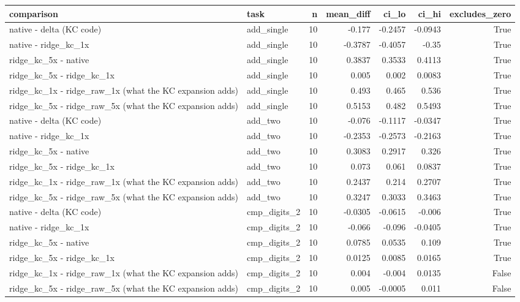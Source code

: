 \begin{table}[t]
\centering
\small
\begin{tabular}{llrrrrr}
\toprule
comparison & task & n & mean\_diff & ci\_lo & ci\_hi & excludes\_zero \\
\midrule
native - delta (KC code) & add\_single & 10 & -0.177 & -0.2457 & -0.0943 & True \\
native - ridge\_kc\_1x & add\_single & 10 & -0.3787 & -0.4057 & -0.35 & True \\
ridge\_kc\_5x - native & add\_single & 10 & 0.3837 & 0.3533 & 0.4113 & True \\
ridge\_kc\_5x - ridge\_kc\_1x & add\_single & 10 & 0.005 & 0.002 & 0.0083 & True \\
ridge\_kc\_1x - ridge\_raw\_1x (what the KC expansion adds) & add\_single & 10 & 0.493 & 0.465 & 0.536 & True \\
ridge\_kc\_5x - ridge\_raw\_5x (what the KC expansion adds) & add\_single & 10 & 0.5153 & 0.482 & 0.5493 & True \\
native - delta (KC code) & add\_two & 10 & -0.076 & -0.1117 & -0.0347 & True \\
native - ridge\_kc\_1x & add\_two & 10 & -0.2353 & -0.2573 & -0.2163 & True \\
ridge\_kc\_5x - native & add\_two & 10 & 0.3083 & 0.2917 & 0.326 & True \\
ridge\_kc\_5x - ridge\_kc\_1x & add\_two & 10 & 0.073 & 0.061 & 0.0837 & True \\
ridge\_kc\_1x - ridge\_raw\_1x (what the KC expansion adds) & add\_two & 10 & 0.2437 & 0.214 & 0.2707 & True \\
ridge\_kc\_5x - ridge\_raw\_5x (what the KC expansion adds) & add\_two & 10 & 0.3247 & 0.3033 & 0.3463 & True \\
native - delta (KC code) & cmp\_digits\_2 & 10 & -0.0305 & -0.0615 & -0.006 & True \\
native - ridge\_kc\_1x & cmp\_digits\_2 & 10 & -0.066 & -0.096 & -0.0405 & True \\
ridge\_kc\_5x - native & cmp\_digits\_2 & 10 & 0.0785 & 0.0535 & 0.109 & True \\
ridge\_kc\_5x - ridge\_kc\_1x & cmp\_digits\_2 & 10 & 0.0125 & 0.0085 & 0.0165 & True \\
ridge\_kc\_1x - ridge\_raw\_1x (what the KC expansion adds) & cmp\_digits\_2 & 10 & 0.004 & -0.004 & 0.0135 & False \\
ridge\_kc\_5x - ridge\_raw\_5x (what the KC expansion adds) & cmp\_digits\_2 & 10 & 0.005 & -0.0005 & 0.011 & False \\

\end{tabular}
\end{table}
